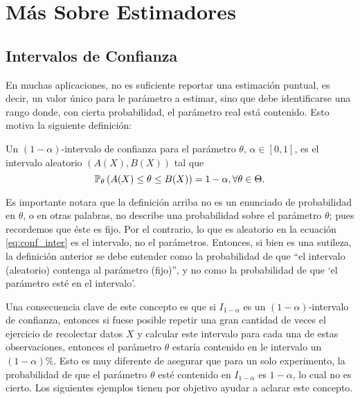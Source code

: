 

\chapter{Más Sobre Estimadores}

\section{Intervalos de Confianza} 

En muchas aplicaciones, no es suficiente reportar una estimación puntual, es decir, un valor único para le parámetro a estimar, sino que debe identificarse una rango donde, con cierta probabilidad, el parámetro real está contenido. Esto motiva la siguiente definición: 

\begin{definition}
\label{def:conf_inter} Un $(1-\alpha)$-intervalo de confianza para el parámetro $\theta$, $\alpha\in[0,1]$, es el intervalo aleatorio $(A(X),B(X))$ tal que 
\begin{equation}
	\label{eq:conf_inter}
	\mathbb{P}_\theta \left(A(X)\leq\theta\leq B(X)\right) = 1-\alpha, \forall \theta\in\Theta.
\end{equation}
\end{definition}

\begin{remark}
	Es importante notara que la definición arriba no es un enunciado de probabilidad en $\theta$, o en otras palabras, no describe una probabilidad sobre el parámetro $\theta$; pues recordemos que éste es fijo. Por el contrario, lo que es aleatorio en la ecuación \eqref{eq:conf_inter} es el intervalo, no el parámetros. Entonces, si bien es una sutileza, la definición anterior se debe entender como la probabilidad de que ``el intervalo (aleatorio) contenga al parámetro (fijo)'', y no como la probabilidad de que `el parámetro esté en el intervalo'. 
\end{remark}
Una consecuencia clave de este concepto es que si $I_{1-\alpha}$ es un $(1-\alpha)$-intervalo de confianza, entonces si fuese posible repetir una gran cantidad de veces el ejercicio de recolectar datos $X$ y calcular este intervalo para cada una de estas observaciones, entonces el parámetro $\theta$ estaría contenido en le intervalo un $(1-\alpha)\%$. Esto es muy diferente de asegurar que para un solo experimento, la probabilidad de que el parámetro $\theta$ esté contenido en $I_{1-\alpha}$ es $1-\alpha$, lo cual no es cierto. Los siguientes ejemplos tienen por objetivo ayudar a aclarar este concepto.

